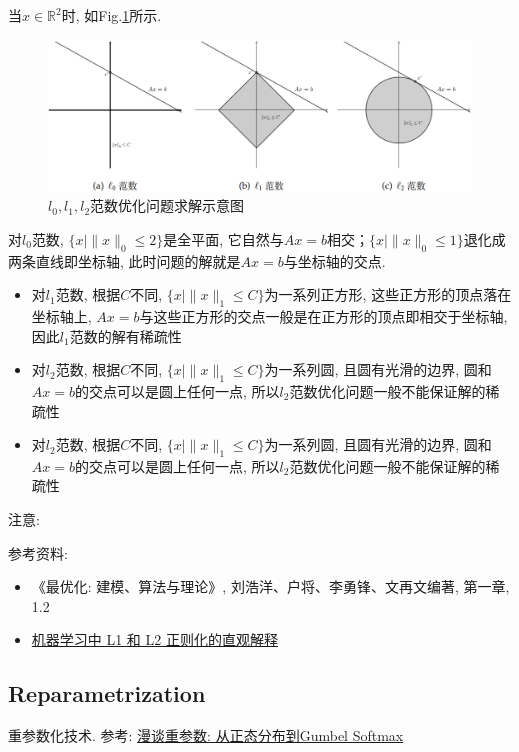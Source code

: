 当$x \in \mathbb{R}^2$时, 如Fig.\ref{fig:norm optimize}所示. 
\begin{figure}[h]
	\centering
	\includegraphics[width=.85\textwidth]{pics/norm optimize.png}
	\caption{$l_0, l_1, l_2$范数优化问题求解示意图}
	\label{fig:norm optimize}
\end{figure}
对$l_0$范数, $\{x | \|x\|_0 \leq 2\}$是全平面, 它自然与$A x = b$相交；$\{x | \|x\|_0 \leq 1\}$退化成两条直线即坐标轴, 此时问题的解就是$A x = b$与坐标轴的交点. 
\begin{itemize}
	\item 对$l_1$范数, 根据$C$不同, $\{x | \|x\|_1 \leq C\}$为一系列正方形, 这些正方形的顶点落在坐标轴上, $A x = b$与这些正方形的交点一般是在正方形的顶点即相交于坐标轴, 因此$l_1$范数的解有稀疏性
	\item 对$l_2$范数, 根据$C$不同, $\{x | \|x\|_1 \leq C\}$为一系列圆, 且圆有光滑的边界, 圆和$A x = b$的交点可以是圆上任何一点, 所以$l_2$范数优化问题一般不能保证解的稀疏性
	\item 对$l_2$范数, 根据$C$不同, $\{x | \|x\|_1 \leq C\}$为一系列圆, 且圆有光滑的边界, 圆和$A x = b$的交点可以是圆上任何一点, 所以$l_2$范数优化问题一般不能保证解的稀疏性
\end{itemize}

注意: 

参考资料: 
\begin{itemize}
	\item《最优化: 建模、算法与理论》, 刘浩洋、户将、李勇锋、文再文编著, 第一章, 1.2
	\item \href{https://blog.csdn.net/red_stone1/article/details/80755144}{机器学习中 L1 和 L2 正则化的直观解释}
\end{itemize}


\subsection{Reparametrization}重参数化技术. 参考: \href{https://spaces.ac.cn/archives/6705}{漫谈重参数: 从正态分布到Gumbel Softmax}

